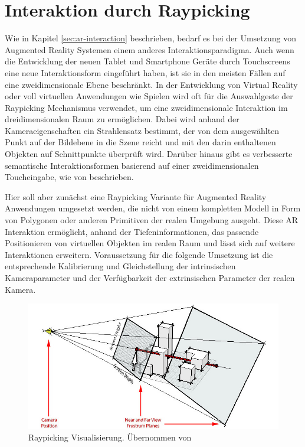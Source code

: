 \section{Interaktion durch Raypicking} \label{sec:ar-depth-interaction}

Wie in Kapitel \ref{sec:ar-interaction} beschrieben, bedarf es bei der Umsetzung von Augmented Reality Systemen einem anderes Interaktionsparadigma. Auch wenn die Entwicklung der neuen Tablet und Smartphone Geräte durch Touchscreens eine neue Interaktionsform eingeführt haben, ist sie in den meisten Fällen auf eine zweidimensionale Ebene beschränkt. In der Entwicklung von Virtual Reality oder voll virtuellen Anwendungen wie Spielen wird oft für die Auswahlgeste der Raypicking Mechanismus verwendet, um eine zweidimensionale Interaktion im dreidimensionalen Raum zu ermöglichen. Dabei wird anhand der Kameraeigenschaften ein Strahlensatz bestimmt, der von dem ausgewählten Punkt auf der Bildebene in die Szene reicht und mit den darin enthaltenen Objekten auf Schnittpunkte überprüft wird. Darüber hinaus gibt es verbesserte semantische Interaktionsformen basierend auf einer zweidimensionalen Toucheingabe, wie von \citet{elmqvist2008semantic} beschrieben.

Hier soll aber zunächst eine Raypicking Variante für Augmented Reality Anwendungen umgesetzt werden, die nicht von einem kompletten Modell in Form von Polygonen oder anderen Primitiven der realen Umgebung ausgeht. Diese AR Interaktion ermöglicht, anhand der Tiefeninformationen, das passende Positionieren von virtuellen Objekten im realen Raum und lässt sich auf weitere Interaktionen erweitern. Voraussetzung für die folgende Umsetzung ist die entsprechende Kalibrierung und Gleichstellung der intrinsischen Kameraparameter und der Verfügbarkeit der extrinsischen Parameter der realen Kamera. 

\begin{figure}[h]
  \centering
	\includegraphics[width=1.0\textwidth]{content/images/methods/interaction.jpg} 
  \caption{Raypicking Visualisierung. Übernommen von \citet{gluUn11:online}}
  \label{fig:interaction}
\end{figure}

